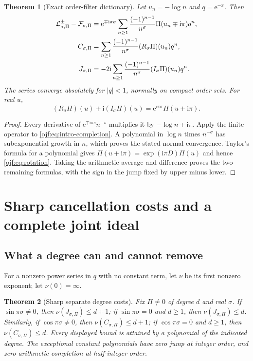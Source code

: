 \documentclass[11pt,a4paper]{article}
\numberwithin{equation}{section}
\newtheorem{theorem}{Theorem}[section]
\theoremstyle{definition}\newtheorem{definition}[theorem]{Definition}
\theoremstyle{remark}\newtheorem{remark}[theorem]{Remark}
\newcommand{\ee}{\mathrm e}\newcommand{\ii}{\mathrm i}\newcommand{\dd}{\,\mathrm d}
\begin{document}
\begin{theorem}[Exact order-filter dictionary]\label{ojf:thm:dictionary}
Let $u_n=-\log n$ and $q=\ee^{-x}$. Then
\begin{align}
 \calL^\pm_{\sigma,\Pi}-\calF_{\sigma,\Pi}
 &=\ee^{\mp\ii\pi\sigma}
       \sum_{n\ge1}\frac{(-1)^{n-1}}{n^\sigma}
                      \Pi(u_n\mp\ii\pi)q^n,\label{ojf:eq:filter-full}\\
 C_{\sigma,\Pi}
 &=\sum_{n\ge1}\frac{(-1)^{n-1}}{n^\sigma}(R_\sigma\Pi)(u_n)q^n,
                                                        \label{ojf:eq:filter-C}\\
 J_{\sigma,\Pi}
 &=-2\ii\sum_{n\ge1}\frac{(-1)^{n-1}}{n^\sigma}(I_\sigma\Pi)(u_n)q^n.
                                                        \label{ojf:eq:filter-J}
\end{align}
The series converge absolutely for $|q|<1$, normally on compact order
sets. For real $u$,
\begin{equation}\label{ojf:eq:rotation}
 (R_\sigma\Pi)(u)+\ii(I_\sigma\Pi)(u)
      =\ee^{\ii\pi\sigma}\Pi(u+\ii\pi).
\end{equation}
\end{theorem}
\begin{proof}
Every derivative of
$\ee^{\mp\ii\pi s}n^{-s}$ multiplies it by
$-\log n\mp\ii\pi$. Apply the finite operator to
\eqref{ojf:eq:intro-completion}. A polynomial in $\log n$ times
$n^{-\sigma}$ has subexponential growth in $n$, which proves the stated
normal convergence. Taylor's formula for a polynomial gives
$\Pi(u+\ii\pi)=\exp(\ii\pi D)\Pi(u)$ and hence
\eqref{ojf:eq:rotation}. Taking the arithmetic average and difference
proves the two remaining formulas, with the sign in the jump fixed by
upper minus lower.
\end{proof}

\section{Sharp cancellation costs and a complete joint ideal}
\label{ojf:sec:filters}

\subsection{What a degree can and cannot remove}
For a nonzero power series in $q$ with no constant term, let $\nu$ be its
first nonzero exponent; let $\nu(0)=\infty$.

\begin{theorem}[Sharp separate degree costs]\label{ojf:thm:cost}
Fix $\Pi\ne0$ of degree $d$ and real $\sigma$.
If $\sin\pi\sigma\ne0$, then $\nu(J_{\sigma,\Pi})\le d+1$;
if $\sin\pi\sigma=0$ and $d\ge1$, then
$\nu(J_{\sigma,\Pi})\le d$.
Similarly, if $\cos\pi\sigma\ne0$, then
$\nu(C_{\sigma,\Pi})\le d+1$;
if $\cos\pi\sigma=0$ and $d\ge1$, then
$\nu(C_{\sigma,\Pi})\le d$.
Every displayed bound is attained by a polynomial of the indicated degree.
The exceptional constant polynomials have zero jump at integer order,
and zero arithmetic completion at half-integer order.
\end{theorem}
\end{document}
